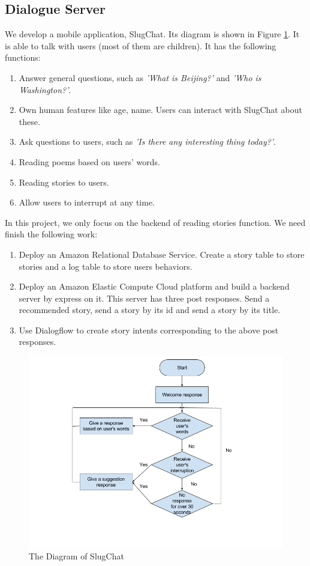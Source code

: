 \documentclass[sigconf]{acmart}
\begin{document}
\subsection{Dialogue Server}
We develop a mobile application, SlugChat. Its diagram is shown in Figure \ref{fig:diagram_slugchat}. It is able to talk with users (most of them are children). It has the following functions:
\begin{enumerate}
\item Answer general questions, such as \emph{'What is Beijing?'} and \emph{'Who is Washington?'}. 
\item Own human features like age, name. Users can interact with SlugChat about these.
\item Ask questions to users, such as  \emph{'Is there any interesting thing today?'}.
\item Reading poems based on users' words.
\item Reading stories to users.
\item Allow users to interrupt at any time. 
\end{enumerate}
In this project, we only focus on the backend of reading stories function. We need finish the following work:
\begin{enumerate}
\item Deploy an Amazon Relational Database Service. Create a story table to store stories and a log table to store users behaviors.
\item Deploy an Amazon Elastic Compute Cloud platform and build a backend server by express on it. This server has three post responses. Send a recommended story, send a story by its id and send a story by its title.  
\item Use Dialogflow to create story intents corresponding to the above post responses.
\end{enumerate}

\begin{figure}
\includegraphics[width = .55\textwidth]{diagram_slugchat.png}
\caption{The Diagram of SlugChat}
\label{fig:diagram_slugchat}
\end{figure}
\end{document}
